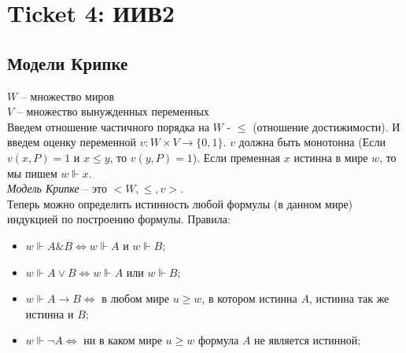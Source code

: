 \section{Ticket 4: ИИВ2}
\subsection{Модели Крипке}
$W$ -- множество миров\\
$V$ -- множество вынужденных переменных\\
Введем отношение частичного порядка на $W$ - $\leq$ (отношение достижимости). И введем оценку переменной $v: W \times V \rightarrow \lbrace 0, 1 \rbrace$. $v$ должна быть монотонна (Если $v(x, P) = 1$ и $x \leq y$, то $v(y, P) = 1$). Если пременная $x$ истинна в мире $w$, то мы пишем $w \Vdash x$.\\
\emph{Модель Крипке} -- это $<W, \leq, v>$.\\
Теперь можно определить истинность любой формулы (в данном мире) индукцией по построению формулы. Правила:
\begin{itemize}
\item $w \Vdash A \& B \Leftrightarrow w \Vdash A$ и $w \Vdash B$;
\item $w \Vdash A \vee B \Leftrightarrow w \Vdash A$ или $w \Vdash B$;
\item $w \Vdash A \rightarrow B \Leftrightarrow$ в любом мире $u \geq w$, в котором истинна $A$, истинна так же истинна и $B$;
\item $w \Vdash \neg A \Leftrightarrow$ ни в каком мире $u \geq w$ формула $A$ не является истинной;
\end{itemize}
